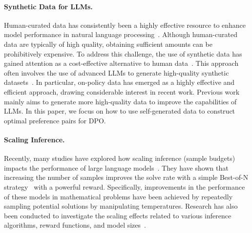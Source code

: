\paragraph{Synthetic Data for LLMs.} 
Human-curated data has consistently been a highly effective resource to enhance model performance in natural language processing~\cite{bai2022traininghelpfulharmlessassistant, kpf2023openassistant}.
Although human-curated data are typically of high quality, obtaining sufficient amounts can be prohibitively expensive. 
To address this challenge, the use of synthetic data has gained attention as a cost-effective alternative to human data~\cite{west-etal-2022-symbolic, hsieh-etal-2023-distilling, wang-etal-2023-self-instruct, dong2024selfboostinglargelanguagemodels, li2024selfalignment}.
This approach often involves the use of advanced LLMs to generate high-quality synthetic datasets~\cite{tajwar2024preferencefinetuningllmsleverage, dong2023raft, agarwal2024onpolicy}.
In particular, on-policy data has emerged as a highly effective and efficient approach, drawing considerable interest in recent work.
Previous work mainly aims to generate more high-quality data to improve the capabilities of LLMs.
In this paper, we focus on how to use self-generated data to construct optimal preference pairs for DPO.



\paragraph{Scaling Inference.}
Recently, many studies have explored how scaling inference (sample budgets) impacts the performance of large language models~\cite{wu2024scaling, brown2024largelanguagemonkeysscaling, snell2024scalingllmtesttimecompute, zhang2024scalingllminferenceoptimized}. 
They have shown that increasing the number of samples improves the solve rate with a simple Best-of-N strategy~\cite{amini2024variationalbestofnalignment} with a powerful reward. 
Specifically, improvements in the performance of these models in mathematical problems have been achieved by repeatedly sampling potential solutions by manipulating temperatures. 
Research has also been conducted to investigate the scaling effects related to various inference algorithms, reward functions, and model sizes~\cite{chi2024thoughtsculptreasoningintermediaterevision, wu2024scaling}.
